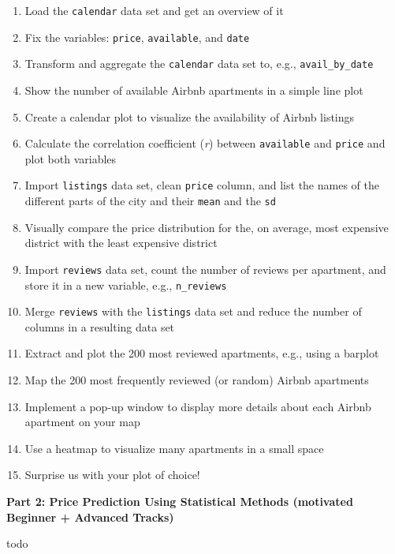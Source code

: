 \documentclass[
  11pt,
]{article}
\begin{document}
\begin{enumerate}
\def\labelenumi{\arabic{enumi}.}
\item
  Load the \texttt{calendar} data set and get an overview of it
\item
  Fix the variables: \texttt{price}, \texttt{available}, and \texttt{date}
\item
  Transform and aggregate the \texttt{calendar} data set to, e.g., \texttt{avail\_by\_date}
\item
  Show the number of available Airbnb apartments in a simple line plot
\item
  Create a calendar plot to visualize the availability of Airbnb listings
\item
  Calculate the correlation coefficient (\emph{r}) between \texttt{available} and \texttt{price} and plot both variables
\item
  Import \texttt{listings} data set, clean \texttt{price} column, and list the names of the different parts of the city and their \texttt{mean} and the \texttt{sd}
\item
  Visually compare the price distribution for the, on average, most expensive district with the least expensive district
\item
  Import \texttt{reviews} data set, count the number of reviews per apartment, and store it in a new variable, e.g., \texttt{n\_reviews}
\item
  Merge \texttt{reviews} with the \texttt{listings} data set and reduce the number of columns in a resulting data set
\item
  Extract and plot the 200 most reviewed apartments, e.g., using a barplot
\item
  Map the 200 most frequently reviewed (or random) Airbnb apartments
\item
  Implement a pop-up window to display more details about each Airbnb apartment on your map
\item
  Use a heatmap to visualize many apartments in a small space
\item
  Surprise us with your plot of choice!
\end{enumerate}

\textbf{Part 2: Price Prediction Using Statistical Methods (motivated Beginner + Advanced Tracks)}

todo
\end{document}
